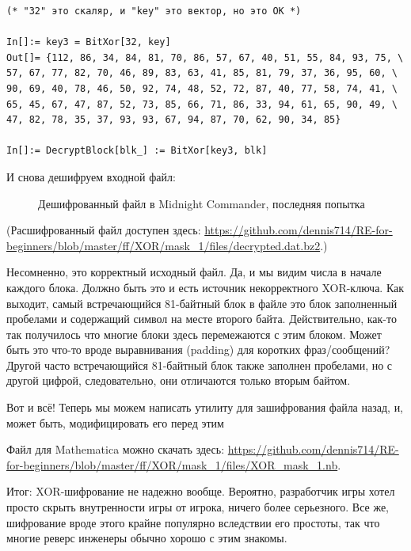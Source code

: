 \begin{lstlisting}[style=custommath]
(* "32" это скаляр, и "key" это вектор, но это OK *)

In[]:= key3 = BitXor[32, key]
Out[]= {112, 86, 34, 84, 81, 70, 86, 57, 67, 40, 51, 55, 84, 93, 75, \
57, 67, 77, 82, 70, 46, 89, 83, 63, 41, 85, 81, 79, 37, 36, 95, 60, \
90, 69, 40, 78, 46, 50, 92, 74, 48, 52, 72, 87, 40, 77, 58, 74, 41, \
65, 45, 67, 47, 87, 52, 73, 85, 66, 71, 86, 33, 94, 61, 65, 90, 49, \
47, 82, 78, 35, 37, 93, 93, 67, 94, 87, 70, 62, 90, 34, 85}

In[]:= DecryptBlock[blk_] := BitXor[key3, blk]
\end{lstlisting}

И снова дешифруем входной файл:

\begin{figure}[H]
\centering
{}
\caption{Дешифрованный файл в Midnight Commander, последняя попытка}
\end{figure}

(Расшифрованный файл доступен здесь:
\url{https://github.com/dennis714/RE-for-beginners/blob/master/ff/XOR/mask_1/files/decrypted.dat.bz2}.)

Несомненно, это корректный исходный файл.
Да, и мы видим числа в начале каждого блока. Должно быть это и есть источник некорректного XOR-ключа.
Как выходит, самый встречающийся 81-байтный блок в файле это блок заполненный пробелами и содержащий символ  на месте
второго байта.
Действительно, как-то так получилось что многие блоки здесь перемежаются с этим блоком.
Может быть это что-то вроде выравнивания (padding) для коротких фраз/сообщений?
Другой часто встречающийся 81-байтный блок также заполнен пробелами, но с другой цифрой, следовательно,
они отличаются только вторым байтом.

Вот и всё! Теперь мы можем написать утилиту для зашифрования файла назад, и, может быть, модифицировать его перед этим

Файл для Mathematica можно скачать здесь:
\url{https://github.com/dennis714/RE-for-beginners/blob/master/ff/XOR/mask_1/files/XOR_mask_1.nb}.

Итог: XOR-шифрование не надежно вообще. Вероятно, разработчик игры хотел просто скрыть внутренности игры от игрока,
ничего более серьезного.
Все же, шифрование вроде этого крайне популярно вследствии его простоты, так что многие реверс инженеры обычно хорошо
с этим знакомы.

